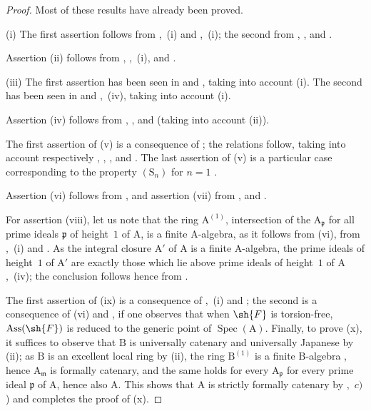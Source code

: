 \begin{proof}
Most of these results have already been proved.

(i) The first assertion follows from ,~(i) and ,~(i); the second from , ,  and .

Assertion (ii) follows from , ,~(i),  and .

(iii) The first assertion has been seen in  and , taking into account (i). The second has been seen in  and ,~(iv), taking into account (i).

Assertion (iv) follows from , ,  and  (taking into account (ii)).

The first assertion of (v) is a consequence of ; the relations follow, taking into account respectively , , ,  and . The last assertion of (v) is a particular case corresponding to the property $(\mathrm{S}_n)$ for $n=1$ .

Assertion (vi) follows from , and assertion (vii) from ,  and .

For assertion (viii), let us note that the ring $\mathrm{A}^{(1)}$, intersection of the $\mathrm{A}_\mathfrak{p}$ for all prime ideals $\mathfrak{p}$ of height~$1$ of $\mathrm{A}$, is a finite $\mathrm{A}$-algebra, as it follows from (vi), from ,~(i) and . As the integral closure $\mathrm{A}'$ of $\mathrm{A}$ is a finite $\mathrm{A}$-algebra, the prime ideals of height~$1$ of $\mathrm{A}'$ are exactly those which lie above prime ideals of height~$1$ of $\mathrm{A}$ ,~(iv); the conclusion follows hence from .

The first assertion of (ix) is a consequence of ,~(i) and ; the second is a consequence of (vi) and , if one observes that when $\sh{F}$ is torsion-free, $\operatorname{Ass}(\sh{F})$ is reduced to the generic point of $\operatorname{Spec}(\mathrm{A})$. Finally, to prove (x), it suffices to observe that $\mathrm{B}$ is universally catenary and universally Japanese by (ii); as $\mathrm{B}$ is an excellent local ring by (ii), the ring $\mathrm{B}^{(1)}$ is a finite $\mathrm{B}$-algebra , hence $\mathrm{A}_\mathfrak{m}$ is formally catenary, and the same holds for every $\mathrm{A}_\mathfrak{p}$ for every prime ideal $\mathfrak{p}$ of $\mathrm{A}$, hence also $\mathrm{A}$. This shows that $\mathrm{A}$ is strictly formally catenary by ,~$c)$) and completes the proof of (x).
\end{proof}


